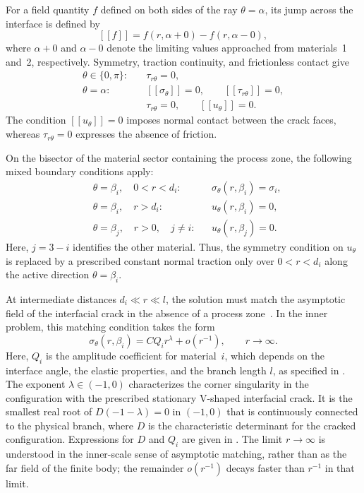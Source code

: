 \documentclass[pdflatex,iicol,sn-mathphys-ay]{sn-jnl}
\newcommand{\jump}[1]{\left[\!\left[#1\right]\!\right]}
\begin{document}
For a field quantity $f$ defined on both sides of the ray
$\theta=\alpha$, its jump across the interface is defined by
\begin{equation*}
  \jump{f}
  =f(r,\alpha+0)-f(r,\alpha-0),
\end{equation*}
where $\alpha+0$ and $\alpha-0$ denote the limiting values approached
from materials~1 and~2, respectively. Symmetry, traction continuity, and
frictionless contact give
\begin{equation}
\label{eq:interface-boundary-conditions}
\begin{aligned}
  \theta\in\{0,\pi\}:\quad
    &\tau_{r\theta}=0,\\
  \theta=\alpha:\quad
    &\jump{\sigma_\theta}=0,\qquad
     \jump{\tau_{r\theta}}=0,\\
    &\tau_{r\theta}=0,\qquad
     \jump{u_\theta}=0.
\end{aligned}
\end{equation}
The condition $\jump{u_\theta}=0$ imposes normal contact between the crack
faces, whereas $\tau_{r\theta}=0$ expresses the absence of friction.

On the bisector of the material sector containing the process zone, the
following mixed boundary conditions apply:
\begin{equation}
\label{eq:process-zone-boundary-conditions}
\begin{aligned}
  &\theta=\beta_i,\quad 0<r<d_i:
    &&\sigma_\theta(r,\beta_i)=\sigma_i,\\
  &\theta=\beta_i,\quad r>d_i:
    &&u_\theta(r,\beta_i)=0,\\
  &\theta=\beta_j,\quad r>0,\quad j\ne i:
    &&u_\theta(r,\beta_j)=0.
\end{aligned}
\end{equation}
Here, $j=3-i$ identifies the other material. Thus, the symmetry
condition on $u_\theta$ is replaced by a prescribed constant normal
traction only over $0<r<d_i$ along the active direction
$\theta=\beta_i$.

At intermediate distances $d_i\ll r\ll l$, the solution must match the
asymptotic field of the interfacial crack in the absence of a process
zone~\citep{NazarenkoKipnis2022Stress}. In the inner problem, this matching
condition takes the form
\begin{equation}
\label{eq:matched-far-field}
  \sigma_\theta(r,\beta_i)
    =CQ_i r^\lambda+o\!\left(r^{-1}\right),
    \qquad r\to\infty.
\end{equation}
Here, $Q_i$ is the amplitude coefficient for material~$i$, which depends
on the interface angle, the elastic properties, and the branch length
$l$, as specified in \AsymptoticsAppendix. The exponent
$\lambda\in(-1,0)$ characterizes the corner singularity in the
configuration with the prescribed stationary V-shaped interfacial crack. It is the smallest real root of
$D(-1-\lambda)=0$ in $(-1,0)$ that is continuously connected to the
physical branch, where $D$ is the characteristic determinant for the
cracked configuration. Expressions for $D$ and $Q_i$ are given in
\AsymptoticsAppendix. The limit $r\to\infty$ is understood in the
inner-scale sense of asymptotic matching, rather than as the far field
of the finite body; the remainder $o(r^{-1})$ decays faster than $r^{-1}$
in that limit.
\end{document}
